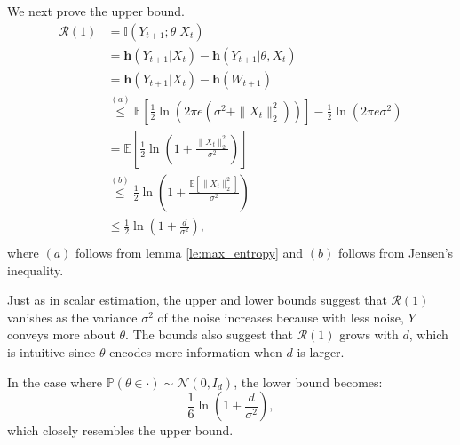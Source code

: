 \documentclass[twoside,11pt]{article}
\renewenvironment{proof}{\par\noindent{\bf Proof\ }}{\hfill\BlackBox\\[2mm]}
\newenvironment{proof}{\par\noindent{\bf Proof\ }}{\hfill\BlackBox\\[2mm]}
\def\regret{\mathcal{R}}
\def\diffentropy{\bf h}
\def\E{\mathbb{E}}
\def\diffentropy{\mathbf{h}}
\def\I{\mathbb{I}}
\def\Pr{\mathbb{P}}
\begin{document}
\begin{proof}
    We next prove the upper bound.
    \begin{align*}
        \regret(1)
        &= \I(Y_{t+1};\theta|X_t)\\
        &= \diffentropy(Y_{t+1}|X_t) - \diffentropy(Y_{t+1}|\theta, X_t)\\
        &= \diffentropy(Y_{t+1}|X_t) - \diffentropy(W_{t+1})\\
        &\overset{(a)}{\leq} \E\left[\frac{1}{2}\ln\left(2\pi e\left(\sigma^2 + \|X_t\|^2_2\right)\right)\right] - \frac{1}{2}\ln\left(2\pi e \sigma^2\right)\\
        &= \E\left[\frac{1}{2}\ln\left(1 + \frac{\|X_{t}\|^2_2}{\sigma^2}\right)\right]\\
        &\overset{(b)}{\leq} \frac{1}{2}\ln\left(1 + \frac{\E\left[\|X_t\|^2_2\right]}{\sigma^2}\right)\\
        &\leq \frac{1}{2}\ln\left(1 + \frac{d}{\sigma^2}\right),\\
    \end{align*}
    where $(a)$ follows from lemma \ref{le:max_entropy} and $(b)$ follows from Jensen's inequality.
\end{proof}

Just as in scalar estimation, the upper and lower bounds suggest that $\regret(1)$ vanishes as the variance $\sigma^2$ of the noise increases because with less noise, $Y$ conveys more about $\theta$. The bounds also suggest that $\regret(1)$ grows with $d$, which is intuitive since $\theta$ encodes more information when $d$ is larger.

In the case where $\Pr(\theta\in\cdot)\sim \mathcal{N}(0, I_d)$, the lower bound becomes:
$$\frac{1}{6}\ln\left(1 + \frac{d}{\sigma^2}\right),$$
which closely resembles the upper bound.
\end{document}
